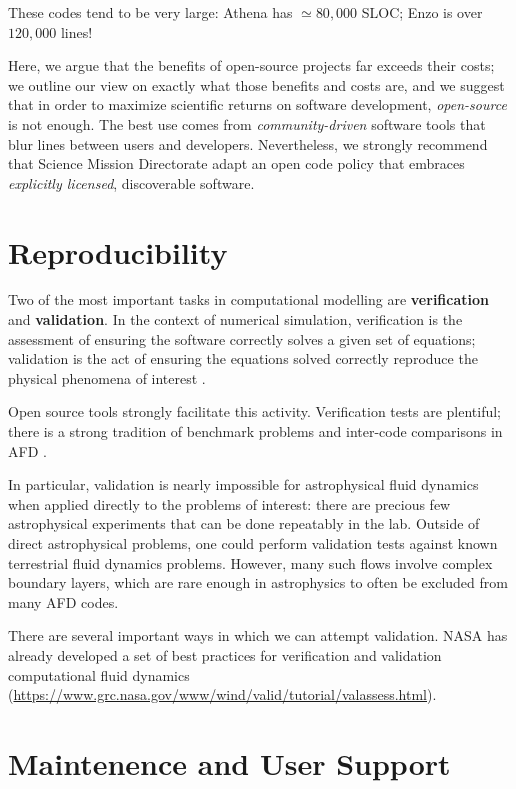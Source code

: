 \documentclass[12pt, preprint]{aastex}
\begin{document}
These codes tend to be very large: Athena has $\simeq 80,000$ SLOC; Enzo is over $120,000$ lines! 

Here, we argue that the benefits of open-source projects far exceeds their costs; we outline our view on exactly what those benefits and costs are, and we suggest that in order to maximize scientific returns on software development, \emph{open-source} is not enough. The best use comes from \emph{community-driven} software tools that blur lines between users and developers. Nevertheless, we strongly recommend that Science Mission Directorate adapt an open code policy that embraces \emph{explicitly licensed}, discoverable software. 

\section{Reproducibility}
\label{sec:repro}

Two of the most important tasks in computational modelling are \textbf{verification} and \textbf{validation}. In the context of numerical simulation, verification is the assessment of ensuring the software correctly solves a given set of equations; validation is the act of ensuring the equations solved correctly reproduce the physical phenomena of interest \citep{2002PrAeS..38..209O}. 

Open source tools strongly facilitate this activity. Verification tests are plentiful; there is a strong tradition of benchmark problems and inter-code comparisons in AFD \citep[e.g.][among many others]{2001JGR...106.3715B,2014GeoJI.197..119M,2014ApJS..210...14K,2016MNRAS.455.4274L}.

In particular, validation is nearly impossible for astrophysical fluid dynamics when applied directly to the problems of interest: there are precious few astrophysical experiments that can be done repeatably in the lab. Outside of direct astrophysical problems, one could perform validation tests against known terrestrial fluid dynamics problems.  However, many such flows involve complex boundary layers, which are rare enough in astrophysics to often be excluded from many AFD codes. 

There are several important ways in which we can attempt validation. NASA has already developed a set of best practices for verification and validation computational fluid dynamics (\url{https://www.grc.nasa.gov/www/wind/valid/tutorial/valassess.html}). 

\section{Maintenence and User Support}
\label{sec:support}
\end{document}
